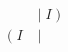 \documentclass[preview]{standalone}
\begin{document}
\begin{align*}
&\big| \; I \; ) \\ (\;I \; &\big| \;
\end{align*}
\end{document}

